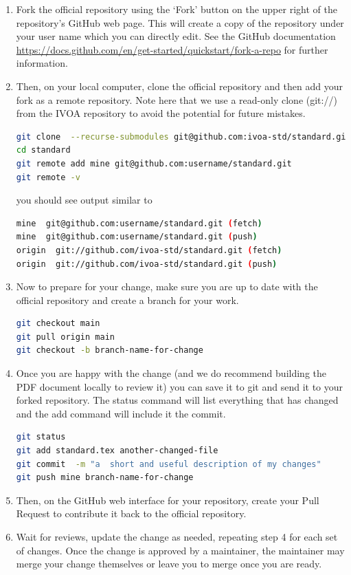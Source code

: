 \documentclass[11pt,a4paper]{ivoa}
\begin{document}
\begin{enumerate}

\item Fork the official repository using the `Fork' button on the upper
right of the repository's GitHub web page. This will create a copy of 
the repository under your user name which you can directly edit. See the
GitHub documentation 
\url{https://docs.github.com/en/get-started/quickstart/fork-a-repo} for 
further information.

\item Then, on your local computer, clone the official repository and 
then add your fork as a remote repository. Note here that we use a 
read-only clone (git://) from the IVOA repository to avoid the potential
for future mistakes. 
\begin{lstlisting}[language=sh]
git clone  --recurse-submodules git@github.com:ivoa-std/standard.git
cd standard
git remote add mine git@github.com:username/standard.git
git remote -v
\end{lstlisting}

you should see output similar to 
\begin{lstlisting}[language=sh]
mine  git@github.com:username/standard.git (fetch)
mine  git@github.com:username/standard.git (push)
origin  git://github.com/ivoa-std/standard.git (fetch)
origin  git://github.com/ivoa-std/standard.git (push)
\end{lstlisting}


\item Now to prepare for your change, make sure you are up to date with
the official repository and create a branch for your work.
\begin{lstlisting}[language=sh]
git checkout main
git pull origin main
git checkout -b branch-name-for-change
\end{lstlisting}

\item Once you are happy with the change (and we do recommend building
the PDF document locally to review it) you can save it to git and send 
it to your forked repository.  The status command will list everything 
that has changed and the add command will include it the commit.

\begin{lstlisting}[language=sh]
git status
git add standard.tex another-changed-file
git commit  -m "a  short and useful description of my changes"
git push mine branch-name-for-change
\end{lstlisting}

\item  Then, on the GitHub web interface for your repository, create
your Pull Request to contribute it back to the official repository.

\item  Wait for reviews, update the change as needed, repeating step 4
for each set of changes. Once the change is approved by a maintainer,
the maintainer may merge your change themselves or leave you to merge
once you are ready.
\end{enumerate}
\end{document}
